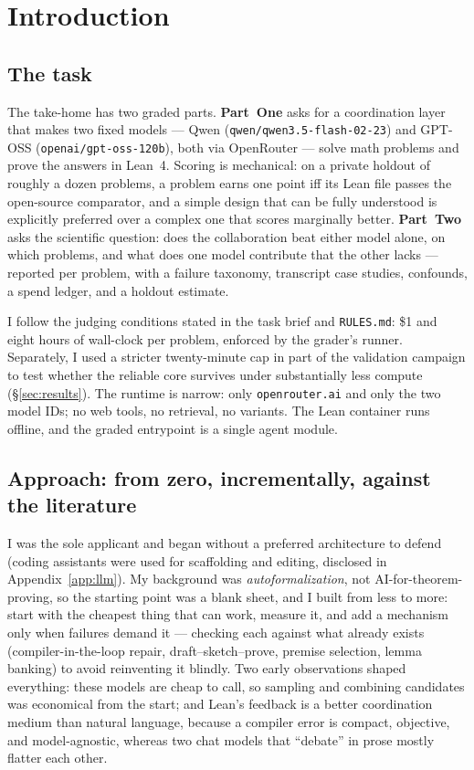 \section{Introduction}
\label{sec:intro}

\subsection{The task}
The take-home has two graded parts. \textbf{Part~One} asks for a coordination
layer that makes two fixed models --- Qwen (\nolinkurl{qwen/qwen3.5-flash-02-23})
and GPT-OSS (\nolinkurl{openai/gpt-oss-120b}), both via OpenRouter --- solve math
problems and prove the answers in Lean~4. Scoring is mechanical: on a private
holdout of roughly a dozen problems, a problem earns one point iff its Lean file
passes the open-source comparator, and a simple design that can be fully
understood is explicitly preferred over a complex one that scores marginally
better. \textbf{Part~Two} asks the scientific question: does the collaboration
beat either model alone, on which problems, and what does one model contribute
that the other lacks --- reported per problem, with a failure taxonomy, transcript
case studies, confounds, a spend ledger, and a holdout estimate.

I follow the judging conditions stated in the task brief and \texttt{RULES.md}:
\$1 and eight hours of wall-clock per problem, enforced by the grader's runner.
Separately, I used a stricter twenty-minute cap in part of the validation campaign
to test whether the reliable core survives under substantially less compute
(\S\ref{sec:results}). The runtime is narrow: only
\nolinkurl{openrouter.ai} and only the two model IDs; no web tools, no retrieval,
no variants. The Lean container runs offline, and the graded entrypoint is a
single agent module.

\subsection{Approach: from zero, incrementally, against the literature}
I was the sole applicant and began without a preferred architecture to defend
(coding assistants were used for scaffolding and editing, disclosed in
Appendix~\ref{app:llm}). My background was \emph{autoformalization}, not
AI-for-theorem-proving, so the starting point was a blank sheet, and I built from
less to more: start with the cheapest thing that
can work, measure it, and add a mechanism only when failures demand it --- checking
each against what already exists (compiler-in-the-loop repair, draft--sketch--prove,
premise selection, lemma banking) to avoid reinventing it blindly. Two early
observations shaped everything: these models are cheap to call, so sampling and
combining candidates was economical from the start; and Lean's feedback is a better
coordination medium than natural language, because a compiler error is compact,
objective, and model-agnostic, whereas two chat models that ``debate'' in prose
mostly flatter each other.

